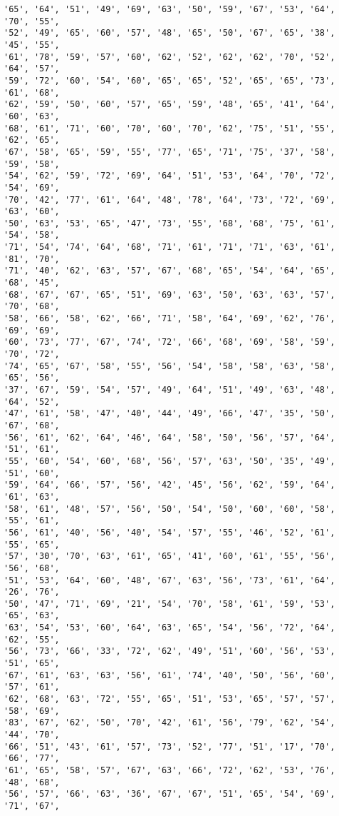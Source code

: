 \documentclass[11pt]{article}
\begin{document}
\begin{Verbatim}[commandchars=\\\{\}]
'65', '64', '51', '49', '69', '63', '50', '59', '67', '53', '64', '70', '55',
'52', '49', '65', '60', '57', '48', '65', '50', '67', '65', '38', '45', '55',
'61', '78', '59', '57', '60', '62', '52', '62', '62', '70', '52', '64', '57',
'59', '72', '60', '54', '60', '65', '65', '52', '65', '65', '73', '61', '68',
'62', '59', '50', '60', '57', '65', '59', '48', '65', '41', '64', '60', '63',
'68', '61', '71', '60', '70', '60', '70', '62', '75', '51', '55', '62', '65',
'67', '58', '65', '59', '55', '77', '65', '71', '75', '37', '58', '59', '58',
'54', '62', '59', '72', '69', '64', '51', '53', '64', '70', '72', '54', '69',
'70', '42', '77', '61', '64', '48', '78', '64', '73', '72', '69', '63', '60',
'50', '63', '53', '65', '47', '73', '55', '68', '68', '75', '61', '54', '58',
'71', '54', '74', '64', '68', '71', '61', '71', '71', '63', '61', '81', '70',
'71', '40', '62', '63', '57', '67', '68', '65', '54', '64', '65', '68', '45',
'68', '67', '67', '65', '51', '69', '63', '50', '63', '63', '57', '70', '68',
'58', '66', '58', '62', '66', '71', '58', '64', '69', '62', '76', '69', '69',
'60', '73', '77', '67', '74', '72', '66', '68', '69', '58', '59', '70', '72',
'74', '65', '67', '58', '55', '56', '54', '58', '58', '63', '58', '65', '56',
'37', '67', '59', '54', '57', '49', '64', '51', '49', '63', '48', '64', '52',
'47', '61', '58', '47', '40', '44', '49', '66', '47', '35', '50', '67', '68',
'56', '61', '62', '64', '46', '64', '58', '50', '56', '57', '64', '51', '61',
'55', '60', '54', '60', '68', '56', '57', '63', '50', '35', '49', '51', '60',
'59', '64', '66', '57', '56', '42', '45', '56', '62', '59', '64', '61', '63',
'58', '61', '48', '57', '56', '50', '54', '50', '60', '60', '58', '55', '61',
'56', '61', '40', '56', '40', '54', '57', '55', '46', '52', '61', '55', '65',
'57', '30', '70', '63', '61', '65', '41', '60', '61', '55', '56', '56', '68',
'51', '53', '64', '60', '48', '67', '63', '56', '73', '61', '64', '26', '76',
'50', '47', '71', '69', '21', '54', '70', '58', '61', '59', '53', '65', '63',
'63', '54', '53', '60', '64', '63', '65', '54', '56', '72', '64', '62', '55',
'56', '73', '66', '33', '72', '62', '49', '51', '60', '56', '53', '51', '65',
'67', '61', '63', '63', '56', '61', '74', '40', '50', '56', '60', '57', '61',
'62', '68', '63', '72', '55', '65', '51', '53', '65', '57', '57', '58', '69',
'83', '67', '62', '50', '70', '42', '61', '56', '79', '62', '54', '44', '70',
'66', '51', '43', '61', '57', '73', '52', '77', '51', '17', '70', '66', '77',
'61', '65', '58', '57', '67', '63', '66', '72', '62', '53', '76', '48', '68',
'56', '57', '66', '63', '36', '67', '67', '51', '65', '54', '69', '71', '67',

\end{Verbatim}
\end{document}
